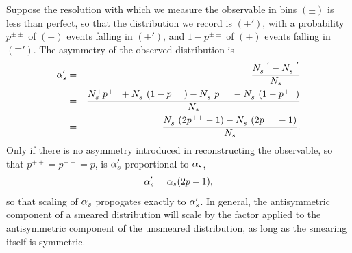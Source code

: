 \documentclass[letterpaper,11pt]{article}
\newcommand{\selected}{{\ensuremath s}}
\begin{document}
Suppose the resolution with which we measure the observable in bins
$(\pm)$ is less than perfect, so that the distribution we record is
$(\pm')$, with a probability $p^{\pm\pm}$ of $(\pm)$ events falling in
$(\pm')$, and $1-p^{\pm\pm}$ of $(\pm)$ events falling in $(\mp')$.
The asymmetry of the observed distribution is
\begin{eqnarray*}
  \alpha'_\selected 
  &=& \frac{N^{+'}_\selected-N^{-'}_\selected}{N_s}\\
  &=& \frac{N^+_\selected p^{++}+N^-_\selected(1-p^{--}) - N^-_\selected p^{--} - N^+_\selected(1-p^{++}) }{N_\selected}\\
  &=& \frac{N^+_\selected(2p^{++}-1) - N^-_\selected (2 p^{--} - 1) }{N_\selected}.
\end{eqnarray*}
Only if there is no asymmetry introduced in reconstructing the
observable, so that $p^{++}=p^{--}=p$, is $\alpha'_\selected$
proportional to $\alpha_\selected$,
\[\alpha'_\selected = \alpha_\selected(2p-1),\]
so that scaling of $\alpha_\selected$ propogates exactly to
$\alpha'_\selected$.  In general, the antisymmetric component of a
smeared distribution will scale by the factor applied to the
antisymmetric component of the unsmeared distribution, as long as the
smearing itself is symmetric.
\end{document}
